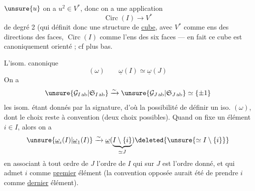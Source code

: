 $\unsure{u}$  on a $u^2\in V^*$, donc on a une application
\[
 \operatorname{Circ}(I)\longrightarrow V^*
\]
de degré 2 (qui définit donc une structure de \uline{cube}, avec $V^*$ comme
ens des directions des faces, $\operatorname{Circ}(I)$ comme l'ens des six faces
--- en fait ce cube est canoniquement orienté ; cf plus bas.


L'isom. canonique
\[
(\omega)\qquad \underline{\omega}(I)\simeq\underline{\omega}(J)
\]
On a
\[
 \unsure{\mathcal{G}_{I\,\mathrm{ab}}|\mathfrak{S}_{I\,\mathrm{ab}}}
 \xrightarrow{\sim}
 \unsure{\mathcal{G}_{J\,\mathrm{ab}}|\mathfrak{S}_{J\,\mathrm{ab}}}\simeq\{\pm1\}
\]
les isom. étant donnés par la signature, d'où la possibilité de définir un iso.
 $(\omega)$, dont le choix reste
 à convention (deux choix possibles).
Quand on fixe un élément $i\in I$, alors on a
\[
 \unsure{\underline{\omega}_i(I)|\underline{\omega}_1(I)}
 \xrightarrow{\sim}
 \underline{\omega}(\underbrace{I\setminus\{i\}}_{\simeq J})
 \deleted{\unsure{\simeq I\setminus\{i\}}}
\]
en associant à tout ordre   de $J$
 l'ordre  de $I$ qui sur $J$ est l'ordre donné,
et qui admet $i$ comme \uline{premier} élément (la convention opposée aurait été
de prendre $i$ comme \uline{dernier} élément).

